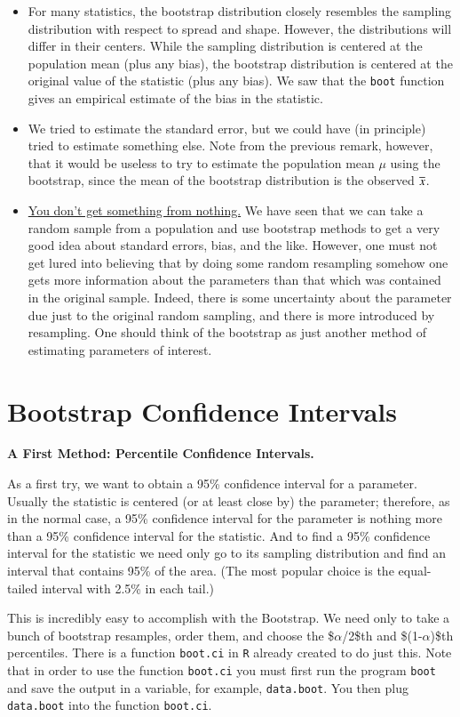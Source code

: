 \documentclass[captions=tableheading]{scrbook}
\begin{document}
\begin{itemize}
\item For many statistics, the bootstrap distribution closely resembles the sampling distribution with respect to spread and shape. However, the distributions will differ in their centers. While the sampling distribution is centered at the population mean (plus any bias), the bootstrap distribution is centered at the original value of the statistic (plus any bias). We saw that the \texttt{boot} function gives an empirical estimate of the bias in the statistic.
\item We tried to estimate the standard error, but we could have (in principle) tried to estimate something else. Note from the previous remark, however, that it would be useless to try to estimate the population mean $\mu$ using the bootstrap, since the mean of the bootstrap distribution is the observed $\overline{x}$.
\item \underline{You don't get something from nothing.} We have seen that we can take a random sample from a population and use bootstrap methods to get a very good idea about standard errors, bias, and the like. However, one must not get lured into believing that by doing some random resampling somehow one gets more information about the parameters than that which was contained in the original sample. Indeed, there is some uncertainty about the parameter due just to the original random sampling, and there is more introduced by resampling. One should think of the bootstrap as just another method of estimating parameters of interest.
\end{itemize}
\section{Bootstrap Confidence Intervals}
\label{sec-5_4}


\textbf{A First Method: Percentile Confidence Intervals.}

As a first try, we want to obtain a 95\% confidence interval for a parameter. Usually the statistic is centered (or at least close by) the parameter; therefore, as in the normal case, a 95\% confidence interval for the parameter is nothing more than a 95\% confidence interval for the statistic. And to find a 95\% confidence interval for the statistic we need only go to its sampling distribution and find an interval that contains 95\% of the area. (The most popular choice is the equal-tailed interval with 2.5\% in each tail.)

This is incredibly easy to accomplish with the Bootstrap. We need only to take a bunch of bootstrap resamples, order them, and choose the \$$\alpha$/2\$th and \$(1-$\alpha$)\$th percentiles. There is a function \texttt{boot.ci} in \texttt{R} already created to do just this. Note that in order to use the function \texttt{boot.ci} you must first run the program \texttt{boot} and save the output in a variable, for example, \texttt{data.boot}.  You then plug \texttt{data.boot} into the function \texttt{boot.ci}.
\end{document}
